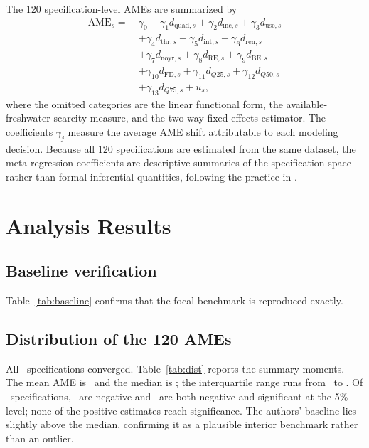 \documentclass[12pt]{article}
\begin{document}
The 120 specification-level AMEs are summarized by
\begin{equation}
\begin{aligned}
\text{AME}_s =\ & \gamma_0 + \gamma_1 d_{\text{quad},s} + \gamma_2 d_{\text{inc},s} + \gamma_3 d_{\text{use},s} \\
& + \gamma_4 d_{\text{thr},s} + \gamma_5 d_{\text{int},s} + \gamma_6 d_{\text{ren},s} \\
& + \gamma_7 d_{\text{noyr},s} + \gamma_8 d_{\text{RE},s} + \gamma_9 d_{\text{BE},s} \\
& + \gamma_{10} d_{\text{FD},s} + \gamma_{11} d_{Q25,s} + \gamma_{12} d_{Q50,s} \\
& + \gamma_{13} d_{Q75,s} + u_s,
\end{aligned}
\label{eq:metareg}
\end{equation}
where the omitted categories are the linear functional form, the available-freshwater scarcity measure, and the two-way fixed-effects estimator. The coefficients $\gamma_j$ measure the average AME shift attributable to each modeling decision. Because all 120 specifications are estimated from the same dataset, the meta-regression coefficients are descriptive summaries of the specification space rather than formal inferential quantities, following the practice in \citet{banzhaf_smith_2007}.

\section{Analysis Results}

\subsection*{Baseline verification}

Table~\ref{tab:baseline} confirms that the focal benchmark is reproduced exactly.



\subsection*{Distribution of the 120 AMEs}

All \TotalSpecs\ specifications converged. Table~\ref{tab:dist} reports the summary moments. The mean AME is \MeanAME\ and the median is \MedianAME; the interquartile range runs from \PTwentyFiveAME\ to \PSeventyFiveAME. Of \TotalSpecs\ specifications, \NegativeCount\ are negative and \NegativeSigCount\ are both negative and significant at the 5\% level; none of the positive estimates reach significance. The authors' baseline lies slightly above the median, confirming it as a plausible interior benchmark rather than an outlier.
\end{document}
